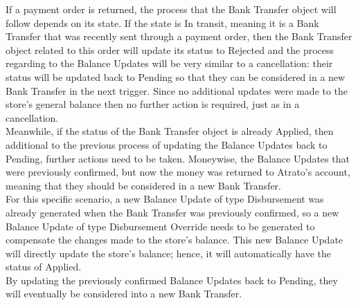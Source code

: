 If a payment order is returned, the process that the Bank Transfer object will follow depends on its state. If the state is In transit, meaning it is a Bank Transfer that was recently sent through a payment order, then the Bank Transfer object related to this order will update its status to Rejected and the process regarding to the Balance Updates will be very similar to a cancellation: their status will be updated back to Pending so that they can be considered in a new Bank Transfer in the next trigger. Since no additional updates were made to the store’s general balance then no further action is required, just as in a cancellation.\\

Meanwhile, if the status of the Bank Transfer object is already Applied, then additional to the previous process of updating the Balance Updates back to Pending, further actions need to be taken. Moneywise, the Balance Updates that were previously confirmed, but now the money was returned to Atrato’s account, meaning that they should be considered in a new Bank Transfer.\\

For this specific scenario, a new Balance Update of type Disbursement was already generated when the Bank Transfer was previously confirmed, so a new Balance Update of type Disbursement Override needs to be generated to compensate the changes made to the store’s balance. This new Balance Update will directly update the store’s balance; hence, it will automatically have the status of Applied.\\

By updating the previously confirmed Balance Updates back to Pending, they will eventually be considered into a new Bank Transfer.

